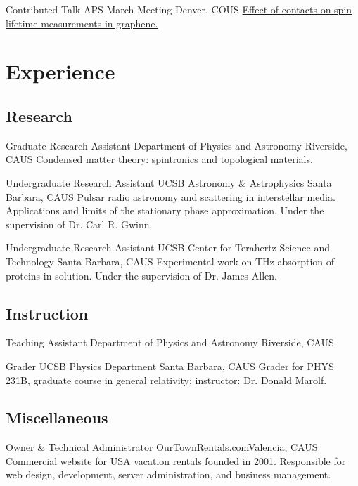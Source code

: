 \documentclass[10pt,letter]{moderncv}
\begin{document}
    {Contributed Talk}
    {APS March Meeting}
    {Denver, CO}{US}
    {\href{https://io.evansosenko.com/deck-spin-lifetime/}
      {Effect of contacts on spin lifetime measurements in graphene.}}

  \section{Experience}

  \subsection{Research}

    {Graduate Research Assistant}
    {Department of Physics and Astronomy}
    {Riverside, CA}{US}
    {Condensed matter theory: spintronics and topological materials.}

    {Undergraduate Research Assistant}
    {UCSB Astronomy \& Astrophysics}
    {Santa Barbara, CA}{US}
    {Pulsar radio astronomy and scattering in interstellar media.
      Applications and limits of the stationary phase approximation.
      Under the supervision of Dr. Carl R. Gwinn.}

    {Undergraduate Research Assistant}
    {UCSB Center for Terahertz Science and Technology}
    {Santa Barbara, CA}{US}
    {Experimental work on THz absorption of proteins in solution.
      Under the supervision  of Dr. James Allen.}

  \subsection{Instruction}

    {Teaching Assistant}
    {Department of Physics and Astronomy}
    {Riverside, CA}{US}{}

    {Grader}
    {UCSB Physics Department}
    {Santa Barbara, CA}{US}
    {Grader for PHYS 231B, graduate course in general relativity; instructor: Dr. Donald Marolf.}

  \subsection{Miscellaneous}

    {Owner \& Technical Administrator}
    {OurTownRentals.com}{Valencia, CA}{US}
    {Commercial website for USA vacation rentals founded in 2001.
      Responsible for web design, development, server administration, and business management.}
\end{document}
